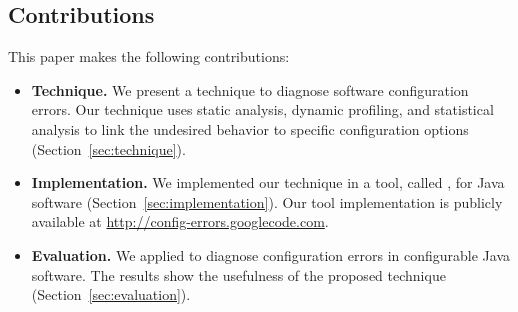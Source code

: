 



\subsection{Contributions}
This paper makes the following contributions:

\begin{itemize}

\item \textbf{Technique.} We present a technique to diagnose
software configuration errors. Our technique uses static analysis,
dynamic profiling, and statistical analysis to link the
undesired behavior to specific configuration options (Section~\ref{sec:technique}).


\item \textbf{Implementation.} We implemented our technique 
in a tool, called \ourtool, for Java software (Section~\ref{sec:implementation}). Our tool implementation is publicly available at
\url{http://config-errors.googlecode.com}. 


\item \textbf{Evaluation.} We applied \ourtool to diagnose
\errors configuration errors in \subjectnum
configurable Java software. The results
show the usefulness of the proposed technique (Section~\ref{sec:evaluation}).

\end{itemize}



